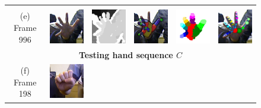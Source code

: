 \begin{figure}
\begin{tabular}{@{}cc@{}c@{}c@{}c@{}c@{}}
		\label{fig/hand/multi4} \\
		\raisebox{1cm}{\parbox{2cm}{\centering (e)\\Frame 996}} & 
		\includegraphics[width=2.4cm]{fig/hand/qual/rgb/image_0996.png} &
		\includegraphics[width=2.4cm]{fig/hand/qual/depth/image_0996.png} &
		\includegraphics[width=2.4cm]{fig/hand/qual/forth/image_0996.png} &
		\includegraphics[width=2.4cm]{fig/hand/qual/class/class-996.png} &
		\includegraphics[width=2.4cm]{fig/hand/qual/vote/image_0996.png}
		\label{fig/hand/multi5} \\ 
		\hline 
		\multicolumn{6}{c}{\textbf{Testing hand sequence $C$}} \\ 
		\hline 
		\raisebox{1cm}{\parbox{2cm}{\centering (f)\\Frame 198}} &
		\includegraphics[width=2.4cm]{fig/hand/qual/rgb/image_0198.png} &

\end{tabular}
\end{figure}
